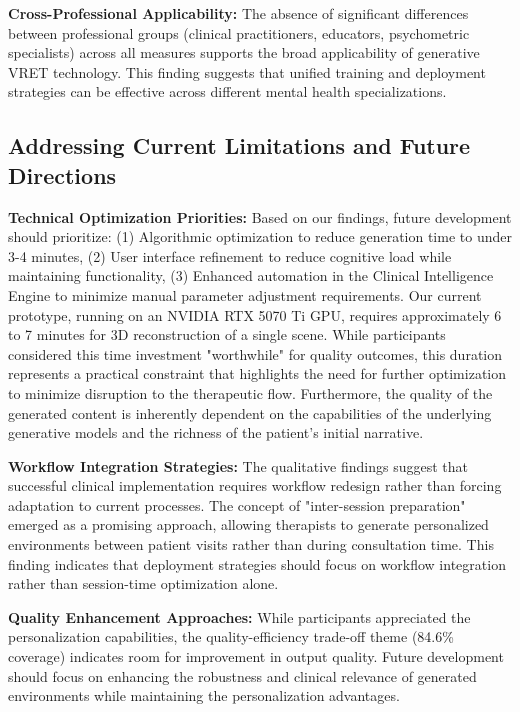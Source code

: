 \documentclass[]{interact}
\begin{document}
\textbf{Cross-Professional Applicability:} The absence of significant differences between professional groups (clinical practitioners, educators, psychometric specialists) across all measures supports the broad applicability of generative VRET technology. This finding suggests that unified training and deployment strategies can be effective across different mental health specializations.

\subsection{Addressing Current Limitations and Future Directions}

\textbf{Technical Optimization Priorities:} Based on our findings, future development should prioritize: (1) Algorithmic optimization to reduce generation time to under 3-4 minutes, (2) User interface refinement to reduce cognitive load while maintaining functionality, (3) Enhanced automation in the Clinical Intelligence Engine to minimize manual parameter adjustment requirements. Our current prototype, running on an NVIDIA RTX 5070 Ti GPU, requires approximately 6 to 7 minutes for 3D reconstruction of a single scene. While participants considered this time investment "worthwhile" for quality outcomes, this duration represents a practical constraint that highlights the need for further optimization to minimize disruption to the therapeutic flow. Furthermore, the quality of the generated content is inherently dependent on the capabilities of the underlying generative models and the richness of the patient's initial narrative. 

\textbf{Workflow Integration Strategies:} The qualitative findings suggest that successful clinical implementation requires workflow redesign rather than forcing adaptation to current processes. The concept of "inter-session preparation" emerged as a promising approach, allowing therapists to generate personalized environments between patient visits rather than during consultation time. This finding indicates that deployment strategies should focus on workflow integration rather than session-time optimization alone.

\textbf{Quality Enhancement Approaches:} While participants appreciated the personalization capabilities, the quality-efficiency trade-off theme (84.6\% coverage) indicates room for improvement in output quality. Future development should focus on enhancing the robustness and clinical relevance of generated environments while maintaining the personalization advantages.
\end{document}
